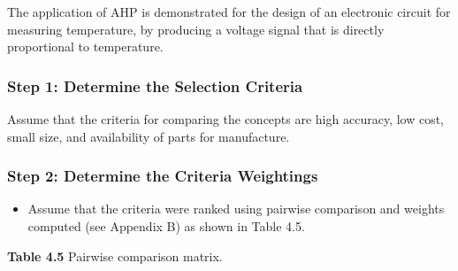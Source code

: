 The application of AHP is demonstrated for the design of an electronic
circuit for measuring temperature, by producing a voltage signal that is
directly proportional to temperature.

\subsubsection*{Step 1: Determine the Selection
Criteria}\label{step-1-determine-the-selection-criteria}

Assume that the criteria for comparing the concepts are high accuracy,
low cost, small size, and availability of parts for manufacture.

\subsubsection*{Step 2: Determine the Criteria
Weightings}\label{step-2-determine-the-criteria-weightings}

\begin{itemize}
\item
  Assume that the criteria were ranked using pairwise comparison and
  weights computed (see Appendix B) as shown in Table 4.5.
\end{itemize}

\textbf{Table 4.5} Pairwise comparison matrix.

